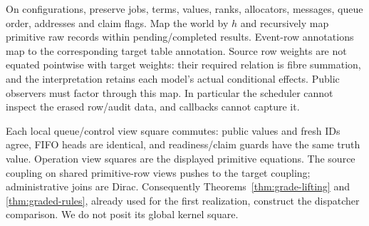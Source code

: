 \documentclass[11pt]{article}
\begin{document}
On configurations, preserve jobs, terms, values, ranks, allocators, messages, queue order, addresses and claim flags. Map the world by $h$ and recursively map primitive raw records within pending/completed results. Event-row annotations map to the corresponding target table annotation. Source row weights are not equated pointwise with target weights: their required relation is fibre summation, and the interpretation retains each model's actual conditional effects. Public observers must factor through this map. In particular the scheduler cannot inspect the erased row/audit data, and callbacks cannot capture it.

Each local queue/control view square commutes: public values and fresh IDs agree, FIFO heads are identical, and readiness/claim guards have the same truth value. Operation view squares are the displayed primitive equations. The source coupling on shared primitive-row views pushes to the target coupling; administrative joins are Dirac. Consequently Theorems~\ref{thm:grade-lifting} and \ref{thm:graded-rules}, already used for the first realization, construct the dispatcher comparison. We do not posit its global kernel square.
\end{document}
